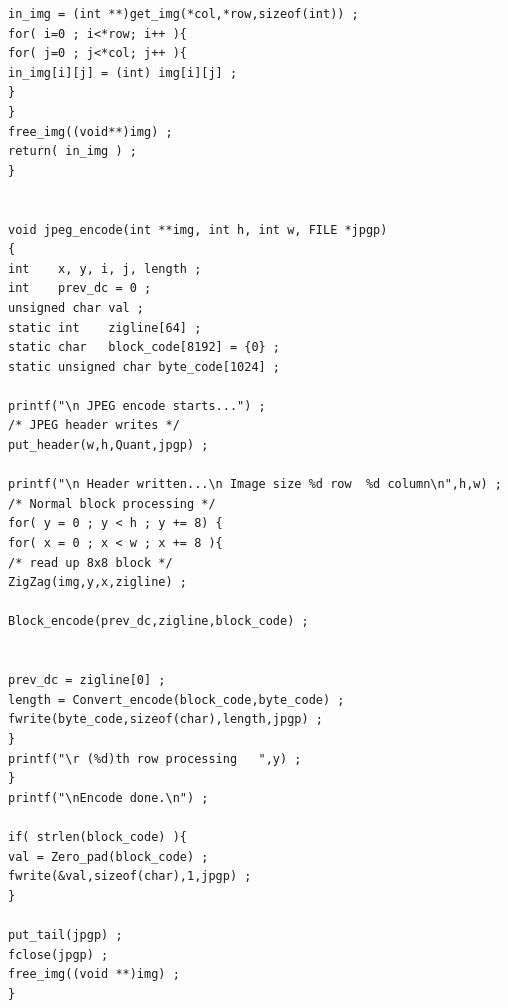 \documentclass[paper=a4, fontsize=11pt]{scrartcl} %
\numberwithin{equation}{section} %
\numberwithin{figure}{section} %
\numberwithin{table}{section} %
\begin{document}
\begin{lstlisting}
in_img = (int **)get_img(*col,*row,sizeof(int)) ;
for( i=0 ; i<*row; i++ ){
for( j=0 ; j<*col; j++ ){
in_img[i][j] = (int) img[i][j] ;
}
}
free_img((void**)img) ;
return( in_img ) ;
}


void jpeg_encode(int **img, int h, int w, FILE *jpgp)
{
int    x, y, i, j, length ; 
int    prev_dc = 0 ;
unsigned char val ;
static int    zigline[64] ;
static char   block_code[8192] = {0} ;
static unsigned char byte_code[1024] ;

printf("\n JPEG encode starts...") ;
/* JPEG header writes */
put_header(w,h,Quant,jpgp) ;

printf("\n Header written...\n Image size %d row  %d column\n",h,w) ;
/* Normal block processing */
for( y = 0 ; y < h ; y += 8) {
for( x = 0 ; x < w ; x += 8 ){
/* read up 8x8 block */
ZigZag(img,y,x,zigline) ;

Block_encode(prev_dc,zigline,block_code) ;


prev_dc = zigline[0] ;
length = Convert_encode(block_code,byte_code) ;
fwrite(byte_code,sizeof(char),length,jpgp) ;
}
printf("\r (%d)th row processing   ",y) ;
}
printf("\nEncode done.\n") ;

if( strlen(block_code) ){
val = Zero_pad(block_code) ;
fwrite(&val,sizeof(char),1,jpgp) ;
}

put_tail(jpgp) ;
fclose(jpgp) ;
free_img((void **)img) ;
}

\end{lstlisting}
\end{document}
